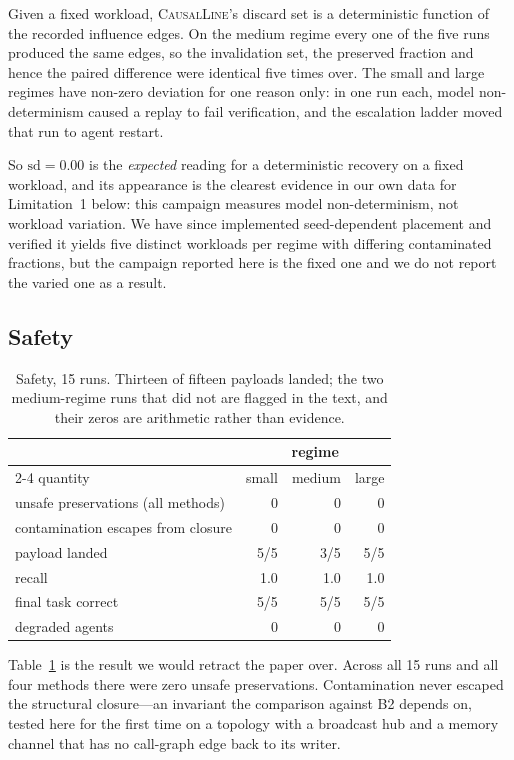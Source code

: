 \documentclass[10pt,twocolumn]{article}
\newcommand{\sys}{\textsc{CausalLine}}
\newcommand{\btwo}{\textsf{B2}}
\begin{document}
Given a fixed workload, \sys{}'s discard set is a deterministic function of the
recorded influence edges. On the medium regime every one of the five runs
produced the same edges, so the invalidation set, the preserved fraction and
hence the paired difference were identical five times over. The small and
large regimes have non-zero deviation for one reason only: in one run each,
model non-determinism caused a replay to fail verification, and the escalation
ladder moved that run to agent restart.

So $\text{sd}=0.00$ is the \emph{expected} reading for a deterministic
recovery on a fixed workload, and its appearance is the clearest evidence in
our own data for Limitation~1 below: this campaign measures model
non-determinism, not workload variation. We have since implemented
seed-dependent placement and verified it yields five distinct workloads per
regime with differing contaminated fractions, but the campaign reported here
is the fixed one and we do not report the varied one as a result.

\subsection{Safety}

\begin{table}[t]
\centering
\small
\begin{tabular}{lrrr}
\toprule
 & \multicolumn{3}{c}{regime} \\
\cmidrule(lr){2-4}
quantity & small & medium & large \\
\midrule
unsafe preservations (all methods) & 0 & 0 & 0 \\
contamination escapes from closure & 0 & 0 & 0 \\
payload landed                     & 5/5 & 3/5 & 5/5 \\
recall                             & 1.0 & 1.0 & 1.0 \\
final task correct                 & 5/5 & 5/5 & 5/5 \\
degraded agents                    & 0 & 0 & 0 \\
\bottomrule
\end{tabular}
\caption{Safety, 15 runs. Thirteen of fifteen payloads landed; the two
medium-regime runs that did not are flagged in the text, and their zeros are
arithmetic rather than evidence.}
\label{tab:safety}
\end{table}

Table~\ref{tab:safety} is the result we would retract the paper over. Across
all 15 runs and all four methods there were zero unsafe preservations.
Contamination never escaped the structural closure---an invariant the
comparison against \btwo{} depends on, tested here for the first time on a
topology with a broadcast hub and a memory channel that has no call-graph edge
back to its writer.
\end{document}
